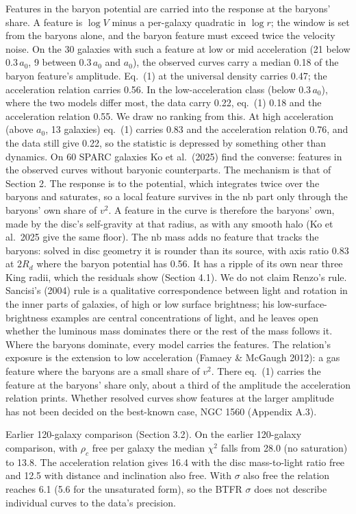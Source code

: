 \documentclass[
  10pt,
]{article}
\begin{document}
Features in the baryon potential are carried into the response at the baryons' share. A feature is $\log V$ minus a per-galaxy quadratic in $\log r$; the window is set from the baryons alone, and the baryon feature must exceed twice the velocity noise. On the 30 galaxies with such a feature at low or mid acceleration (21 below $0.3\,a_0$, 9 between $0.3\,a_0$ and $a_0$), the observed curves carry a median 0.18 of the baryon feature's amplitude. Eq.~(1) at the universal density carries 0.47; the acceleration relation carries 0.56. In the low-acceleration class (below $0.3\,a_0$), where the two models differ most, the data carry 0.22, eq.~(1) 0.18 and the acceleration relation 0.55. We draw no ranking from this. At high acceleration (above $a_0$, 13 galaxies) eq.~(1) carries 0.83 and the acceleration relation 0.76, and the data still give 0.22, so the statistic is depressed by something other than dynamics. On 60 SPARC galaxies Ko et al.~(2025) find the converse: features in the observed curves without baryonic counterparts. The mechanism is that of Section 2. The response is to the potential, which integrates twice over the baryons and saturates, so a local feature survives in the nb part only through the baryons' own share of $v^2$. A feature in the curve is therefore the baryons' own, made by the disc's self-gravity at that radius, as with any smooth halo (Ko et al.~2025 give the same floor). The nb mass adds no feature that tracks the baryons: solved in disc geometry it is rounder than its source, with axis ratio 0.83 at $2R_d$ where the baryon potential has 0.56. It has a ripple of its own near three King radii, which the residuals show (Section 4.1). We do not claim Renzo's rule. Sancisi's (2004) rule is a qualitative correspondence between light and rotation in the inner parts of galaxies, of high or low surface brightness; his low-surface-brightness examples are central concentrations of light, and he leaves open whether the luminous mass dominates there or the rest of the mass follows it. Where the baryons dominate, every model carries the features. The relation's exposure is the extension to low acceleration (Famaey \& McGaugh 2012): a gas feature where the baryons are a small share of $v^2$. There eq.~(1) carries the feature at the baryons' share only, about a third of the amplitude the acceleration relation prints. Whether resolved curves show features at the larger amplitude has not been decided on the best-known case, NGC 1560 (Appendix A.3).

Earlier 120-galaxy comparison (Section 3.2). On the earlier 120-galaxy comparison, with $\rho_c$ free per galaxy the median $\chi^2$ falls from 28.0 (no saturation) to 13.8. The acceleration relation gives 16.4 with the disc mass-to-light ratio free and 12.5 with distance and inclination also free. With $\sigma$ also free the relation reaches 6.1 (5.6 for the unsaturated form), so the BTFR $\sigma$ does not describe individual curves to the data's precision.
\end{document}
